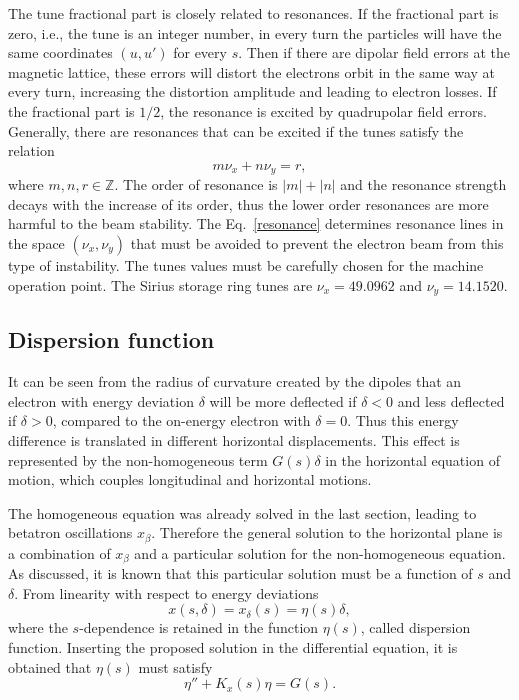 The tune fractional part is closely related to resonances. If the fractional part is zero, i.e., the tune is an integer number, in every turn the particles will have the same coordinates $(u, u')$ for every $s$. Then if there are dipolar field errors at the magnetic lattice, these errors will distort the electrons orbit in the same way at every turn, increasing the distortion amplitude and leading to electron losses. If the fractional part is $1/2$, the resonance is excited by quadrupolar field errors. Generally, there are resonances that can be excited if the tunes satisfy the relation
\begin{equation}
    m \nu_x + n \nu_y = r,
    \label{resonance}
\end{equation}
where $m, n, r \in \mathbb{Z}$. The order of resonance is $|m| + |n|$ and the resonance strength decays with the increase of its order, thus the lower order resonances are more harmful to the beam stability. The Eq.~\eqref{resonance} determines resonance lines in the space $(\nu_x, \nu_y)$ that must be avoided to prevent the electron beam from this type of instability. The tunes values must be carefully chosen for the machine operation point. The Sirius storage ring tunes are $\nu_x = 49.0962$ and $\nu_y=14.1520$.
\subsection{Dispersion function}
It can be seen from the radius of curvature created by the dipoles that an electron with energy deviation $\delta$ will be more deflected if $\delta < 0$ and less deflected if $\delta > 0$, compared to the on-energy electron with $\delta = 0$. Thus this energy difference is translated in different horizontal displacements. This effect is represented by the non-homogeneous term $G(s)\delta$ in the horizontal equation of motion, which couples longitudinal and horizontal motions.

The homogeneous equation was already solved in the last section, leading to betatron oscillations $x_{\beta}$. Therefore the general solution to the horizontal plane is a combination of $x_{\beta}$ and a particular solution for the non-homogeneous equation. As discussed, it is known that this particular solution must be a function of $s$ and $\delta$. From linearity with respect to energy deviations
\begin{equation}
    x(s, \delta) = x_{\delta}(s) = \eta(s) \delta,
\end{equation}
where the $s$-dependence is retained in the function $\eta(s)$, called dispersion function. Inserting the proposed solution in the differential equation, it is obtained that $\eta(s)$ must satisfy
\begin{equation}
    \eta'' + K_x(s)\eta = G(s).
    \label{eq:dispersion}
\end{equation}

